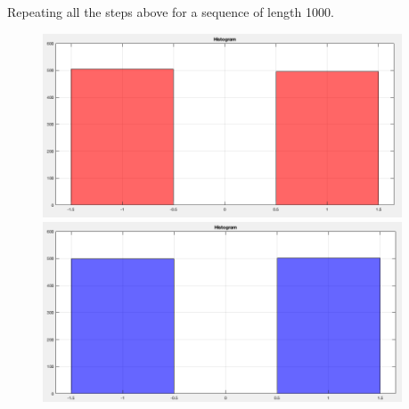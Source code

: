 \documentclass[12pt]{article}
\begin{document}
    \vspace{10pt}
    Repeating all the steps above for a sequence of length 1000.

    \begin{figure}[H]
      \centering
      \begin{minipage}{0.5\textwidth}
        \centering
        \includegraphics[width=0.95\textwidth]{seq1_1000_hist.png}
      \end{minipage}%
      \begin{minipage}{0.5\textwidth}
        \centering
        \includegraphics[width=0.95\textwidth]{seq2_1000_hist.png}
      \end{minipage}
    \end{figure}
\end{document}
